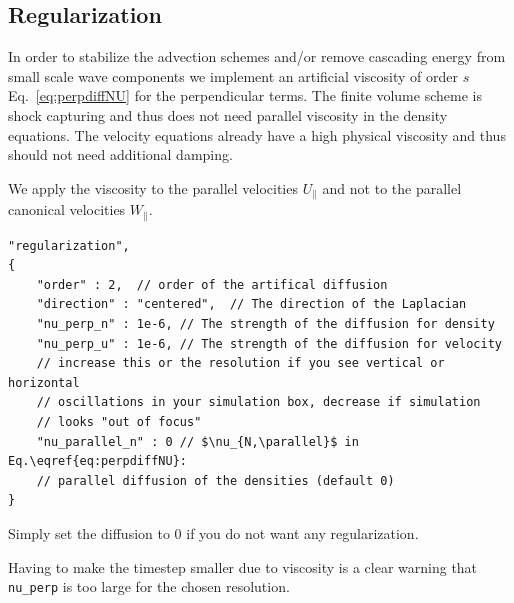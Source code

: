 \subsection{Regularization} \label{sec:regularization}
In order to stabilize the advection schemes and/or remove cascading energy
from small scale wave components
we implement an artificial viscosity of order $s$ Eq.~\eqref{eq:perpdiffNU}
for the perpendicular terms.
The finite volume scheme is shock capturing and thus does not need
parallel viscosity in the density equations.
The velocity equations already have a high physical
viscosity and thus should not need additional damping.
\begin{tcolorbox}[title=Note]
    We apply the viscosity to the parallel velocities $U_\parallel$ and
    not to the parallel canonical velocities $W_\parallel$.
\end{tcolorbox}
\begin{verbatim}
"regularization",
{
    "order" : 2,  // order of the artifical diffusion
    "direction" : "centered",  // The direction of the Laplacian
    "nu_perp_n" : 1e-6, // The strength of the diffusion for density
    "nu_perp_u" : 1e-6, // The strength of the diffusion for velocity
    // increase this or the resolution if you see vertical or horizontal
    // oscillations in your simulation box, decrease if simulation
    // looks "out of focus"
    "nu_parallel_n" : 0 // $\nu_{N,\parallel}$ in Eq.\eqref{eq:perpdiffNU}:
    // parallel diffusion of the densities (default 0)
}
\end{verbatim}
Simply set the diffusion to 0 if you do not want any regularization.
\begin{tcolorbox}[title=Note]
    Having to make the timestep smaller due to viscosity
    is a clear warning that \texttt{nu_perp} is too large for the
    chosen resolution.
\end{tcolorbox}

